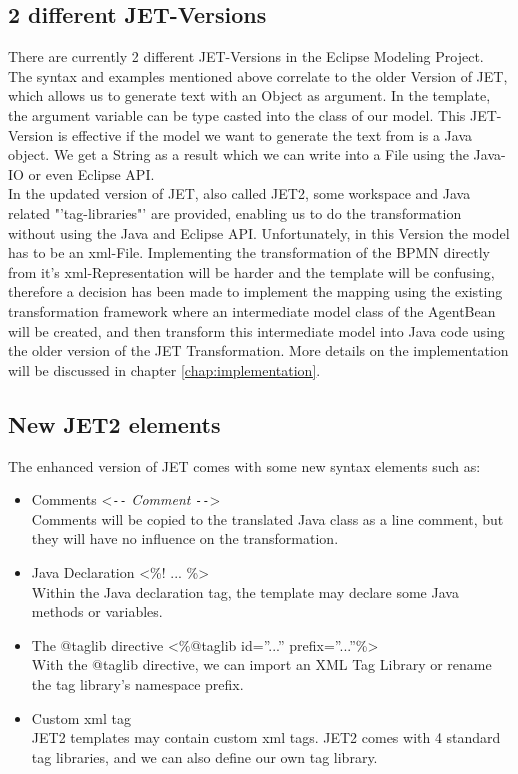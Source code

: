 \subsection{2 different JET-Versions}
There are currently 2 different JET-Versions in the Eclipse Modeling Project. The syntax and examples mentioned above correlate to the older Version of JET, which allows us to generate text with an Object as argument. In the template, the argument variable can be type casted into the class of our model. This JET-Version is effective if the model we want to generate the text from is a Java object. We get a String as a result which we can write into a File using the Java-IO or even Eclipse API.\\

In the updated version of JET, also called JET2, some workspace and Java related "'tag-libraries"' are provided, enabling us to do the transformation without using the Java and Eclipse API. Unfortunately, in this Version the model has to be an xml-File.
Implementing the transformation of the BPMN directly from it's xml-Representation will be harder and the template will be confusing, therefore a decision has been made to implement the mapping using the existing transformation framework where an intermediate model class of the AgentBean will be created, and then transform this intermediate model into Java code using the older version of the JET Transformation.
More details on the implementation will be discussed in chapter \ref{chap:implementation}.

\subsection{New JET2 elements}
The enhanced version of JET comes with some new syntax elements such as:
\begin{itemize}
	\item Comments <\verb|--| \textit{Comment} \verb|--|>\\
	      Comments will be copied to the translated Java class as a line comment, but they will have no influence on the transformation.
	\item Java Declaration <\%! ... \%>\\
	      Within the Java declaration tag, the template may declare some Java methods or variables.
	\item The @taglib directive <\%@taglib id=''...'' prefix=''...''\%>\\
	      With the @taglib directive, we can import an XML Tag Library or rename the tag library's namespace prefix.
	\item Custom xml tag\\
	   		JET2 templates may contain custom xml tags. JET2 comes with 4 standard tag libraries, and we can also define our own tag library.				
\end{itemize}

